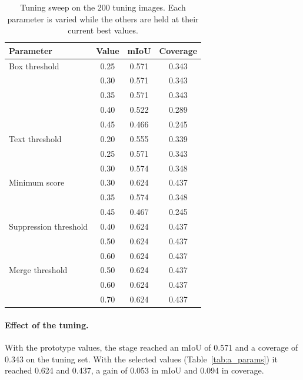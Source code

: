 \documentclass{FastFyp}
\begin{document}
\begin{table}[!ht]
\centering
\caption{Tuning sweep on the 200 tuning images. Each parameter is varied while the others are held at their current best values.}
\label{tab:a_sweep}
\begin{tabular}{|l|c|c|c|}
\hline
\textbf{Parameter} & \textbf{Value} & \textbf{mIoU} & \textbf{Coverage} \\ \hline
Box threshold & 0.25 & 0.571 & 0.343 \\
 & 0.30 & 0.571 & 0.343 \\
 & 0.35 & 0.571 & 0.343 \\
 & 0.40 & 0.522 & 0.289 \\
 & 0.45 & 0.466 & 0.245 \\ \hline
Text threshold & 0.20 & 0.555 & 0.339 \\
 & 0.25 & 0.571 & 0.343 \\
 & 0.30 & 0.574 & 0.348 \\ \hline
Minimum score & 0.30 & 0.624 & 0.437 \\
 & 0.35 & 0.574 & 0.348 \\
 & 0.45 & 0.467 & 0.245 \\ \hline
Suppression threshold & 0.40 & 0.624 & 0.437 \\
 & 0.50 & 0.624 & 0.437 \\
 & 0.60 & 0.624 & 0.437 \\ \hline
Merge threshold & 0.50 & 0.624 & 0.437 \\
 & 0.60 & 0.624 & 0.437 \\
 & 0.70 & 0.624 & 0.437 \\ \hline
\end{tabular}
\end{table}
 
\paragraph{Effect of the tuning.} With the prototype values, the stage reached an mIoU of 0.571 and a coverage of 0.343 on the tuning set. With the selected values (Table~\ref{tab:a_params}) it reached 0.624 and 0.437, a gain of 0.053 in mIoU and 0.094 in coverage.
 
\end{document}
